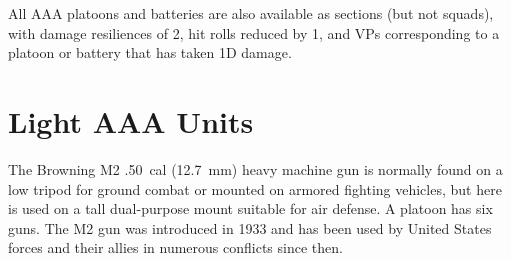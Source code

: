 All AAA platoons and batteries are also available as sections (but not squads), with damage resiliences of 2, hit rolls reduced by 1, and VPs corresponding to a platoon or battery that has taken 1D damage.

%

\section{Light AAA Units}


The Browning M2 .50~cal (12.7~mm) heavy machine gun is normally found on a low tripod for ground combat or mounted on armored fighting vehicles, but here is used on a tall dual-purpose mount suitable for air defense. A platoon has six guns.
The M2 gun was introduced in 1933 and has been used by United States forces and their allies in numerous conflicts since then.%


